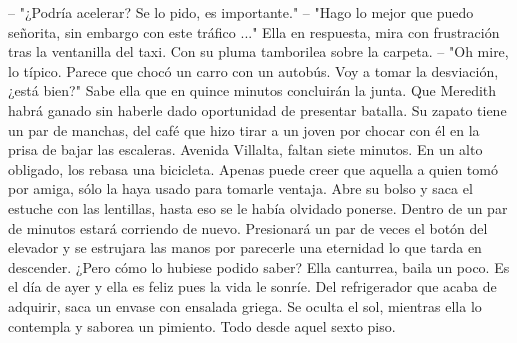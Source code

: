\markdownRendererInterblockSeparator
{}-- "¿Podría acelerar? Se lo pido, es importante."\markdownRendererInterblockSeparator
{}-- "Hago lo mejor que puedo señorita, sin embargo con este tráfico ..."\markdownRendererInterblockSeparator
{}Ella en respuesta, mira con frustración tras la ventanilla del taxi. Con su pluma tamborilea sobre la carpeta.\markdownRendererInterblockSeparator
{}-- "Oh mire, lo típico. Parece que chocó un carro con un autobús. Voy a tomar la desviación, ¿está bien?"\markdownRendererInterblockSeparator
{}Sabe ella que en quince minutos concluirán la junta. Que Meredith habrá ganado sin haberle dado oportunidad de presentar batalla. Su zapato tiene un par de manchas, del café que hizo tirar a un joven por chocar con él en la prisa de bajar las escaleras.\markdownRendererInterblockSeparator
{}Avenida Villalta, faltan siete minutos. En un alto obligado, los rebasa una bicicleta. Apenas puede creer que aquella a quien tomó por amiga, sólo la haya usado para tomarle ventaja. Abre su bolso y saca el estuche con las lentillas, hasta eso se le había olvidado ponerse. Dentro de un par de minutos estará corriendo de nuevo. Presionará un par de veces el botón del elevador y se estrujara las manos por parecerle una eternidad lo que tarda en descender. ¿Pero cómo lo hubiese podido saber?\markdownRendererInterblockSeparator
{}Ella canturrea, baila un poco. Es el día de ayer y ella es feliz pues la vida le sonríe. Del refrigerador que acaba de adquirir, saca un envase con ensalada griega. Se oculta el sol, mientras ella lo contempla y saborea un pimiento. Todo desde aquel sexto piso.\relax